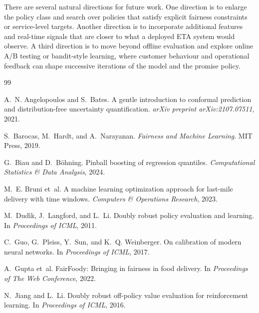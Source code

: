 \documentclass[12pt]{article}
\begin{document}
There are several natural directions for future work. One direction is to enlarge the policy class and search over policies that satisfy explicit fairness constraints or service-level targets. Another direction is to incorporate additional features and real-time signals that are closer to what a deployed ETA system would observe. A third direction is to move beyond offline evaluation and explore online A/B testing or bandit-style learning, where customer behaviour and operational feedback can shape successive iterations of the model and the promise policy.



\begin{thebibliography}{99}

A.~N. Angelopoulos and S.~Bates.
\newblock A gentle introduction to conformal prediction and distribution-free uncertainty quantification.
\newblock \emph{arXiv preprint arXiv:2107.07511}, 2021.

S.~Barocas, M.~Hardt, and A.~Narayanan.
\newblock \emph{Fairness and Machine Learning}.
\newblock MIT Press, 2019.

G.~Biau and D.~B{\"o}hning.
\newblock Pinball boosting of regression quantiles.
\newblock \emph{Computational Statistics \& Data Analysis}, 2024.

M.~E. Bruni et~al.
\newblock A machine learning optimization approach for last-mile delivery with time windows.
\newblock \emph{Computers \& Operations Research}, 2023.

M.~Dud{\'\i}k, J.~Langford, and L.~Li.
\newblock Doubly robust policy evaluation and learning.
\newblock In \emph{Proceedings of ICML}, 2011.

C.~Guo, G.~Pleiss, Y.~Sun, and K.~Q. Weinberger.
\newblock On calibration of modern neural networks.
\newblock In \emph{Proceedings of ICML}, 2017.

A.~Gupta et~al.
\newblock FairFoody: Bringing in fairness in food delivery.
\newblock In \emph{Proceedings of The Web Conference}, 2022.

N.~Jiang and L.~Li.
\newblock Doubly robust off-policy value evaluation for reinforcement learning.
\newblock In \emph{Proceedings of ICML}, 2016.


\end{thebibliography}
\end{document}
